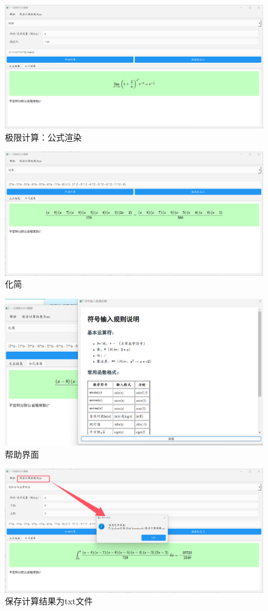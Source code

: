 \documentclass[UTF8,12pt]{ctexart}
\begin{document}
	\begin{figure}[H]
		\centering
		\includegraphics[width=1.0\linewidth]{极限计算_公式渲染}
		\caption{极限计算：公式渲染}
		\label{fig:limit}
	\end{figure}
	\begin{figure}[H]
		\centering
		\includegraphics[width=1.0\linewidth]{化简_公式渲染}
		\caption{化简}
		\label{fig:simplify}
	\end{figure}
	\begin{figure}[H]
		\centering
		\includegraphics[width=1.0\linewidth]{帮助_界面}
		\caption{帮助界面}
		\label{fig:help}
	\end{figure}
	\begin{figure}[H]
		\centering
		\includegraphics[width=0.7\linewidth]{保存计算结果}
		\caption{保存计算结果为txt文件}
		\label{fig:save}
	\end{figure}
\end{document}
